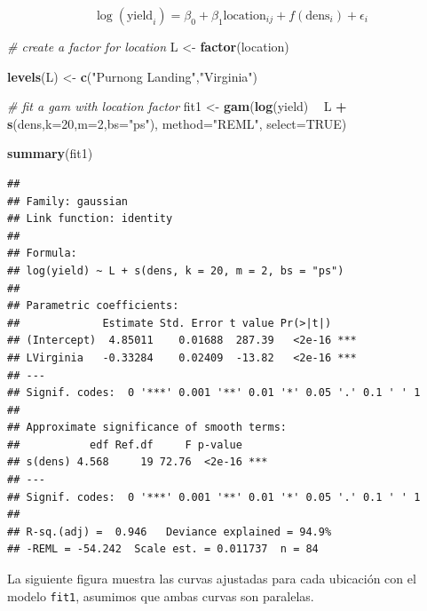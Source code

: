\documentclass[]{book}
\newenvironment{Shaded}{\begin{snugshade}}{\end{snugshade}}
\newcommand{\KeywordTok}[1]{\textcolor[rgb]{0.13,0.29,0.53}{\textbf{#1}}}
\newcommand{\DataTypeTok}[1]{\textcolor[rgb]{0.13,0.29,0.53}{#1}}
\newcommand{\DecValTok}[1]{\textcolor[rgb]{0.00,0.00,0.81}{#1}}
\newcommand{\StringTok}[1]{\textcolor[rgb]{0.31,0.60,0.02}{#1}}
\newcommand{\CommentTok}[1]{\textcolor[rgb]{0.56,0.35,0.01}{\textit{#1}}}
\newcommand{\OtherTok}[1]{\textcolor[rgb]{0.56,0.35,0.01}{#1}}
\newcommand{\OperatorTok}[1]{\textcolor[rgb]{0.81,0.36,0.00}{\textbf{#1}}}
\newcommand{\NormalTok}[1]{#1}
\begin{document}
\[
\log(\text{yield}_i) = \beta_0 + \beta_1\text{location}_{ij} + f(\text{dens}_i) + \epsilon_i
\]

\begin{Shaded}
\begin{Highlighting}[]
\CommentTok{# create a factor for location}
\NormalTok{L <-}\StringTok{ }\KeywordTok{factor}\NormalTok{(location)}

\KeywordTok{levels}\NormalTok{(L) <-}\StringTok{ }\KeywordTok{c}\NormalTok{(}\StringTok{"Purnong Landing"}\NormalTok{,}\StringTok{"Virginia"}\NormalTok{)}

\CommentTok{# fit a gam with location factor}
\NormalTok{fit1 <-}\StringTok{ }\KeywordTok{gam}\NormalTok{(}\KeywordTok{log}\NormalTok{(yield) }\OperatorTok{~}\StringTok{ }\NormalTok{L }\OperatorTok{+}\StringTok{ }\KeywordTok{s}\NormalTok{(dens,}\DataTypeTok{k=}\DecValTok{20}\NormalTok{,}\DataTypeTok{m=}\DecValTok{2}\NormalTok{,}\DataTypeTok{bs=}\StringTok{"ps"}\NormalTok{),}
            \DataTypeTok{method=}\StringTok{"REML"}\NormalTok{, }\DataTypeTok{select=}\OtherTok{TRUE}\NormalTok{)}

\KeywordTok{summary}\NormalTok{(fit1)}
\end{Highlighting}
\end{Shaded}

\begin{verbatim}
## 
## Family: gaussian 
## Link function: identity 
## 
## Formula:
## log(yield) ~ L + s(dens, k = 20, m = 2, bs = "ps")
## 
## Parametric coefficients:
##             Estimate Std. Error t value Pr(>|t|)    
## (Intercept)  4.85011    0.01688  287.39   <2e-16 ***
## LVirginia   -0.33284    0.02409  -13.82   <2e-16 ***
## ---
## Signif. codes:  0 '***' 0.001 '**' 0.01 '*' 0.05 '.' 0.1 ' ' 1
## 
## Approximate significance of smooth terms:
##           edf Ref.df     F p-value    
## s(dens) 4.568     19 72.76  <2e-16 ***
## ---
## Signif. codes:  0 '***' 0.001 '**' 0.01 '*' 0.05 '.' 0.1 ' ' 1
## 
## R-sq.(adj) =  0.946   Deviance explained = 94.9%
## -REML = -54.242  Scale est. = 0.011737  n = 84
\end{verbatim}

La siguiente figura muestra las curvas ajustadas para cada ubicación con
el modelo \texttt{fit1}, asumimos que ambas curvas son paralelas.
\end{document}
